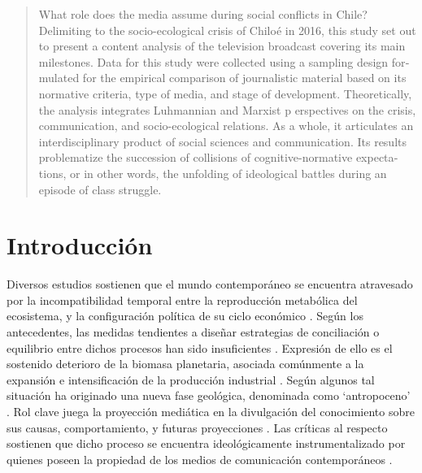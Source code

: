 \documentclass{textolivre}
\begin{document}
\begin{poliabstract}
\begin{english}
\begin{abstract}
What role does the media assume during social conflicts in Chile? Delimiting
to the socio-ecological crisis of Chiloé in 2016, this study set out to present a content
analysis of the television broadcast covering its main milestones. Data for this study were
collected using a sampling design formulated for the empirical comparison of journalistic
material based on its normative criteria, type of media, and stage of development.
Theoretically, the analysis integrates Luhmannian and Marxist p erspectives on the crisis,
communication, and socio-ecological relations. As a whole, it articulates an
interdisciplinary product of social sciences and communication. Its results problematize the
succession of collisions of cognitive-normative expectations, or in other words, the
unfolding of ideological battles during an episode of class struggle.

\end{abstract}
\end{english}

\end{poliabstract}


\section{Introducción}\label{sec-intro}
Diversos estudios sostienen que el mundo contemporáneo se encuentra
atravesado por la incompatibilidad temporal entre la reproducción metabólica del
ecosistema, y la configuración política de su ciclo económico \cite{arboleda,Mascareo2018}.
Según los antecedentes, las medidas tendientes a diseñar
estrategias de conciliación o equilibrio entre dichos procesos han sido insuficientes
\cite{Folke2016}. Expresión de ello es el sostenido deterioro de la biomasa planetaria,
asociada comúnmente a la expansión e intensificación de la producción industrial \cite{ipcc2013,Kamjunke2017}. 
Según algunos tal situación ha originado una nueva fase
geológica, denominada como ‘antropoceno’ \cite{Foster2016}. Rol clave juega la
proyección mediática en la divulgación del conocimiento sobre sus causas,
comportamiento, y futuras proyecciones \cite{billi2017}. Las críticas al
respecto sostienen que dicho proceso se encuentra ideológicamente instrumentalizado
por quienes poseen la propiedad de los medios de comunicación contemporáneos
\cite{Gunderson2019}.
\end{document}
